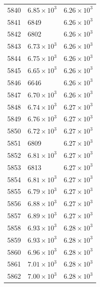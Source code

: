 \begin{table}[H]
\begin{tabular}{lll}
5840 & $\displaystyle 6.85 \times 10^{3}$ & $\displaystyle 6.26 \times 10^{3}$ \\
5841 & 6849 & $\displaystyle 6.26 \times 10^{3}$ \\
5842 & 6802 & $\displaystyle 6.26 \times 10^{3}$ \\
5843 & $\displaystyle 6.73 \times 10^{3}$ & $\displaystyle 6.26 \times 10^{3}$ \\
5844 & $\displaystyle 6.75 \times 10^{3}$ & $\displaystyle 6.26 \times 10^{3}$ \\
5845 & $\displaystyle 6.65 \times 10^{3}$ & $\displaystyle 6.26 \times 10^{3}$ \\
5846 & 6646 & $\displaystyle 6.26 \times 10^{3}$ \\
5847 & $\displaystyle 6.70 \times 10^{3}$ & $\displaystyle 6.26 \times 10^{3}$ \\
5848 & $\displaystyle 6.74 \times 10^{3}$ & $\displaystyle 6.27 \times 10^{3}$ \\
5849 & $\displaystyle 6.76 \times 10^{3}$ & $\displaystyle 6.27 \times 10^{3}$ \\
5850 & $\displaystyle 6.72 \times 10^{3}$ & $\displaystyle 6.27 \times 10^{3}$ \\
5851 & 6809 & $\displaystyle 6.27 \times 10^{3}$ \\
5852 & $\displaystyle 6.81 \times 10^{3}$ & $\displaystyle 6.27 \times 10^{3}$ \\
5853 & 6813 & $\displaystyle 6.27 \times 10^{3}$ \\
5854 & $\displaystyle 6.81 \times 10^{3}$ & $\displaystyle 6.27 \times 10^{3}$ \\
5855 & $\displaystyle 6.79 \times 10^{3}$ & $\displaystyle 6.27 \times 10^{3}$ \\
5856 & $\displaystyle 6.88 \times 10^{3}$ & $\displaystyle 6.27 \times 10^{3}$ \\
5857 & $\displaystyle 6.89 \times 10^{3}$ & $\displaystyle 6.27 \times 10^{3}$ \\
5858 & $\displaystyle 6.93 \times 10^{3}$ & $\displaystyle 6.28 \times 10^{3}$ \\
5859 & $\displaystyle 6.93 \times 10^{3}$ & $\displaystyle 6.28 \times 10^{3}$ \\
5860 & $\displaystyle 6.96 \times 10^{3}$ & $\displaystyle 6.28 \times 10^{3}$ \\
5861 & $\displaystyle 7.01 \times 10^{3}$ & $\displaystyle 6.28 \times 10^{3}$ \\
5862 & $\displaystyle 7.00 \times 10^{3}$ & $\displaystyle 6.28 \times 10^{3}$ \\

\end{tabular}
\end{table}
